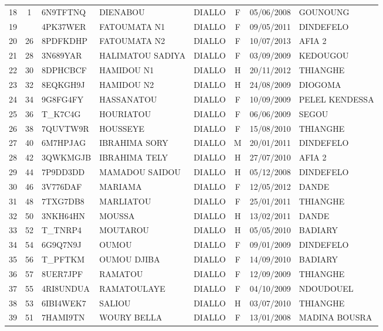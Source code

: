 \documentclass[10pt,a4paper]{article}
\begin{document}
\begin{center}
\begin{tabular}{cclllcll}
18 & 1 & 6N9TFTNQ  & DIENABOU         & DIALLO    & F & 05/06/2008 & GOUNOUNG \\
19 &  & 4PK37WER  & FATOUMATA N1     & DIALLO    & F & 09/05/2011 & DINDEFELO \\
20 & 26 & 8PDFKDHP  & FATOUMATA N2     & DIALLO    & F & 10/07/2013 & AFIA 2 \\
21 & 28 & 3N689YAR  & HALIMATOU SADIYA & DIALLO    & F & 03/09/2009 & KEDOUGOU \\
22 & 30 & 8DPHCBCF  & HAMIDOU N1       & DIALLO    & H & 20/11/2012 & THIANGHE \\
23 & 32 & 8EQKGH9J  & HAMIDOU N2       & DIALLO    & H & 24/08/2009 & DIOGOMA \\
24 & 34 & 9G8FG4FY  & HASSANATOU       & DIALLO    & F & 10/09/2009 & PELEL KENDESSA \\
25 & 36 & T\_K7C4G   & HOURIATOU        & DIALLO    & F & 06/06/2009 & SEGOU \\
26 & 38 & 7QUVTW9R  & HOUSSEYE         & DIALLO    & F & 15/08/2010 & THIANGHE \\
27 & 40 & 6M7HPJAG  & IBRAHIMA SORY    & DIALLO    & M & 20/01/2011 & DINDEFELO \\
28 & 42 & 3QWKMGJB  & IBRAHIMA TELY    & DIALLO    & H & 27/07/2010 & AFIA 2 \\
29 & 44 & 7P9DD3DD  & MAMADOU SAIDOU   & DIALLO    & H & 05/12/2008 & DINDEFELO \\
30 & 46 & 3V776DAF  & MARIAMA          & DIALLO    & F & 12/05/2012 & DANDE \\
31 & 48 & 7TXG7DB8  & MARLIATOU        & DIALLO    & F & 25/01/2011 & THIANGHE \\
32 & 50 & 3NKH64HN  & MOUSSA           & DIALLO    & H & 13/02/2011 & DANDE \\
33 & 52 & T\_TNRP4   & MOUTAROU         & DIALLO    & H & 05/05/2010 & BADIARY \\
34 & 54 & 6G9Q7N9J  & OUMOU            & DIALLO    & F & 09/01/2009 & DINDEFELO \\
35 & 56 & T\_PFTKM   & OUMOU DJIBA      & DIALLO    & F & 14/09/2010 & BADIARY \\
36 & 57 & 8UER7JPF  & RAMATOU          & DIALLO    & F & 12/09/2009 & THIANGHE \\
37 & 55 & 4RI8UNDUA & RAMATOULAYE      & DIALLO    & F & 04/10/2009 & NDOUDOUEL \\
38 & 53 & 6IBI4WEK7 & SALIOU           & DIALLO    & H & 03/07/2010 & THIANGHE \\
39 & 51 & 7HAMI9TN  & WOURY BELLA      & DIALLO    & F & 13/01/2008 & MADINA BOUSRA \\

\end{tabular}
\end{center}
\end{document}
